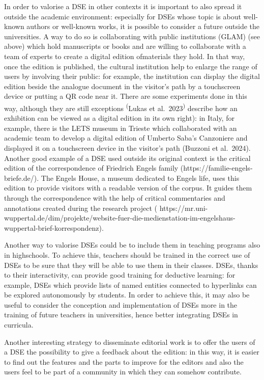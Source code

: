 \documentclass[
  letterpaper,
  DIV=11,
  numbers=noendperiod]{scrreprt}
\begin{document}
In order to valorise a DSE in other contexts it is important to also
spread it outside the academic environment: especially for DSEs whose
topic is about well-known authors or well-known works, it is possible to
consider a future outside the universities. A way to do so is
collaborating with public institutions (GLAM) (see above) which hold
manuscripts or books and are willing to collaborate with a team of
experts to create a digital edition ofmaterials they hold. In that way,
once the edition is published, the cultural institution help to enlarge
the range of users by involving their public: for example, the
institution can display the digital edition beside the analogue document
in the visitor's path by a touchscreen device or putting a QR code near
it. There are some experiments done in this way, although they are still
exceptions \textsuperscript{(}Lukas et al.~2023\textsuperscript{)}
describe how an exhibition can be viewed as a digital edition in its own
right): in Italy, for example, there is the LETS museum in Trieste which
collaborated with an academic team to develop a digital edition of
Umberto Saba's Canzoniere and displayed it on a touchscreen device in
the visitor's path (Buzzoni et al.~2024). Another good example of a DSE
used outside its original context is the critical edition of the
correspondence of Friedrich Engels\textquotesingle{} family
(https://familie-engels-briefe.de/). The Engels House, a museum
dedicated to Engels\textquotesingle{} life, uses this edition to provide
visitors with a readable version of the corpus. It guides them through
the correspondence with the help of critical commentaries and
annotations created during the research project (
https://mr.uni-wuppertal.de/dim/projekte/website-fuer-die-medienstation-im-engelshaus-wuppertal-brief-korrespondenz).

Another way to valorise DSEs could be to include them in teaching
programs also in highschools. To achieve this, teachers should be
trained in the correct use of DSEs to be sure that they will be able to
use them in their classes. DSEs, thanks to their interactivity, can
provide good training for deductive learning: for example, DSEs which
provide lists of named entities connected to hyperlinks can be explored
autonomously by students. In order to achieve this, it may also be
useful to consider the conception and implementation of DSEs more in the
training of future teachers in universities, hence better integrating
DSEs in curricula.

Another interesting strategy to disseminate editorial work is to offer
the users of a DSE the possibility to give a feedback about the edition:
in this way, it is easier to find out the features and the parts to
improve for the editors and also the users feel to be part of a
community in which they can somehow contribute.
\end{document}
